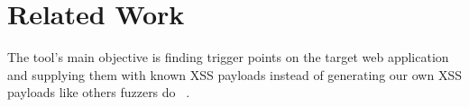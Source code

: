 \chapter{Related Work}
\label{sec:relatedwork}
\minitoc
\vspace*{1cm}

The tool's main objective is finding trigger points on the target web application and supplying them with known XSS payloads instead of generating our own XSS payloads like others fuzzers do ~\cite{duchene2014kameleonfuzz}.
